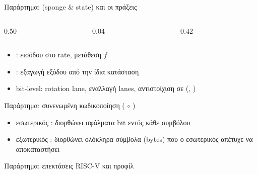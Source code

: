 \begin{frame}{Παράρτημα:  (sponge \& state) και οι πράξεις \Zbb}
  \begin{columns}[T,onlytextwidth]
    \begin{column}{0.50\textwidth}
      \resizebox{\linewidth}{!}{}
    \end{column}
    \begin{column}{0.04\textwidth}
      \centering
      {\tikzexternaldisable
       }
    \end{column}
    \begin{column}{0.42\textwidth}
      \resizebox{\linewidth}{!}{}
    \end{column}
  \end{columns}
  \vspace{0.3em}
  \begin{itemize}
    \item {}:  εισόδου στο rate, μετάθεση $f$
    \item {}: εξαγωγή εξόδου από την ίδια κατάσταση
    \item bit-level: rotation lane, εναλλαγή lanes, αντιστοίχιση σε \Zbb (\rori, )
  \end{itemize}
\end{frame}

\begin{frame}{Παράρτημα: συνενωμένη κωδικοποίηση ( $\circ$ )}
  \centering
  \resizebox{0.75\linewidth}{!}{}
  \begin{itemize}
    \item εσωτερικός : διορθώνει σφάλματα bit εντός κάθε συμβόλου
    \item εξωτερικός : διορθώνει ολόκληρα σύμβολα (bytes) που ο εσωτερικός απέτυχε να αποκαταστήσει
  \end{itemize}
\end{frame}

\begin{frame}{Παράρτημα: επεκτάσεις RISC-V και προφίλ }
  \centering
  
\end{frame}

